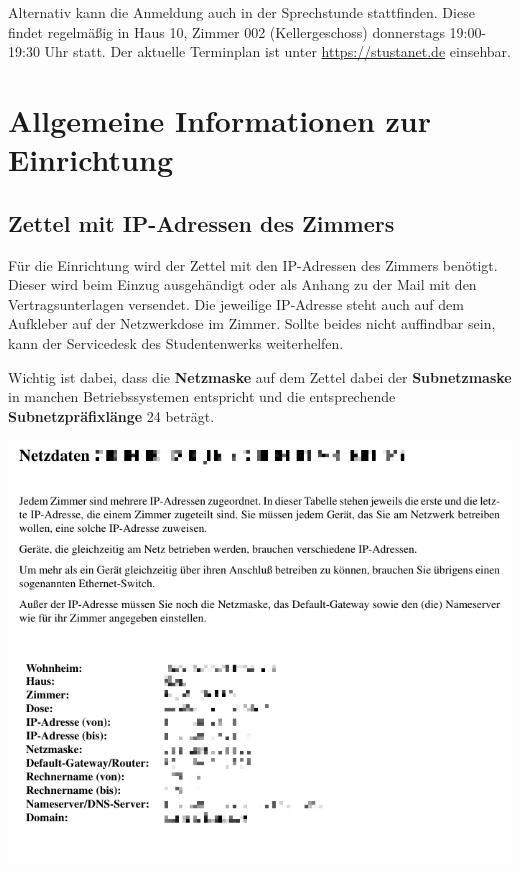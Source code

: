 \documentclass[a4paper,12pt]{scrartcl}
\begin{document}
Alternativ kann die Anmeldung auch in der Sprechstunde stattfinden.
Diese findet regelmäßig in Haus 10, Zimmer 002 (Kellergeschoss) donnerstags 19:00-19:30 Uhr statt.
Der aktuelle Terminplan ist unter \mbox{\url{https://stustanet.de}} einsehbar.

\section{Allgemeine Informationen zur Einrichtung}

\subsection{Zettel mit IP-Adressen des Zimmers}
\label{ip_sheet}
\begin{minipage}{0.57\textwidth}
Für die Einrichtung wird der Zettel mit den IP-Adressen des Zimmers benötigt.
Dieser wird beim Einzug ausgehändigt oder als Anhang zu der Mail mit den Vertragsunterlagen versendet.
Die jeweilige IP-Adresse steht auch auf dem Aufkleber auf der Netzwerkdose im Zimmer.
Sollte beides nicht auffindbar sein, kann der Servicedesk des Studentenwerks weiterhelfen.

Wichtig ist dabei, dass die \textbf{Netzmaske} auf dem Zettel dabei der \textbf{Subnetzmaske} in manchen Betriebssystemen entspricht und die entsprechende \textbf{Subnetzpräfixlänge} 24 beträgt.
\end{minipage}
\hfill
\begin{minipage}{0.4\textwidth}
\includegraphics[width=\linewidth]{Bilder/ip_zettel}
\end{minipage}
\end{document}
